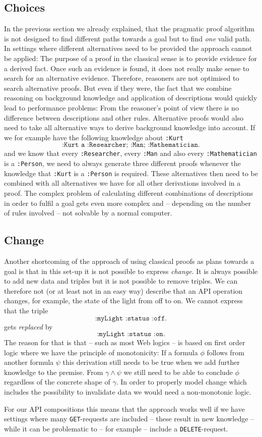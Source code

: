 \subsection{Choices}
In the previous section we already explained, that the pragmatic proof algorithm is not designed to find different paths towards a goal but to find \emph{one} valid path.
In settings where different alternatives need to be provided the approach cannot be applied: 
The purpose of a proof in the classical sense is to provide evidence for a derived fact. 
Once such an evidence is found, 
it does not really make sense to search for an alternative 
evidence. Therefore, \nthree reasoners are not optimised to search alternative proofs. But even if they were,
the fact that we
combine reasoning on background knowledge and application 
of \restdesc descriptions would quickly lead to performance problems:
From the reasoner's point of view there is no difference between \restdesc descriptions and other rules. Alternative proofs would also need to take all alternative 
ways to derive background knowledge into account.  If we for example have the following knowledge about \texttt{:Kurt}
\[
\texttt{:Kurt a :Researcher; :Man; :Mathematician.}
\]
and we know that every \texttt{:Researcher}, every \texttt{:Man} and also every \texttt{:Mathematician} is a \texttt{:Person}, we need to always generate three different 
proofs whenever the knowledge that \texttt{:Kurt} is a \texttt{:Person} is required. 
These alternatives then need to be combined with all alternatives we have for all other derivations involved in a proof.
The complex problem of calculating different combinations of \restdesc descriptions in order to fulfil a goal gets
even more complex and -- depending on the number of rules involved -- not solvable by a normal computer.



\subsection{Change}
Another shortcoming of the approach of using classical proofs as plans towards a goal is that in this set-up it is not possible to express \emph{change}. It is
always possible to add new data and triples but it is not possible to remove triples. 
We can therefore not (or at least not in an easy way) describe that an API operation changes, for example, the state of the light from off to on. 
We cannot express that  the triple
\[
\texttt{:myLight :status :off.}
\]
gets \emph{replaced} by
\[
\texttt{:myLight :status :on.}
\]
The reason for that is that \nthreelogic -- such as most Web logics -- is based on first order logic where we have the principle of monotonicity: 
If a formula $\phi$ follows from 
another formula $\psi$ this derivation still needs to be true when we add further knowledge to the premise. From $\gamma\wedge\psi$ we still need to be able to conclude 
$\phi$ regardless of the concrete shape of $\gamma$. In order to properly model change which includes the possibility to invalidate data we would 
need a non-monotonic logic.

For our API compositions this means that the approach works well if we have settings where many \texttt{GET}-requests are included -- these result in new knowledge -- 
while it can be problematic to -- for example -- include a \texttt{DELETE}-request.

